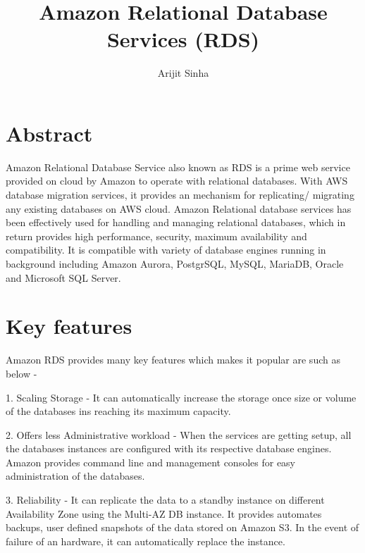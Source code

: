 
\title{Amazon Relational Database Services (RDS)}


\author{Arijit Sinha}


\renewcommand{\shortauthors}{A.Sinha}


\maketitle

\section{Abstract}

Amazon Relational Database Service also known as RDS is a prime web service 
provided on cloud by Amazon to operate with relational databases. 
With AWS database migration services, it provides an mechanism for 
replicating/ migrating any existing databases on AWS cloud.
Amazon Relational database services has been effectively used for  handling
and managing relational databases, which in return provides high performance, 
security, maximum availability and compatibility. 
It is compatible with variety of database engines running in background 
including Amazon Aurora, PostgrSQL, MySQL, MariaDB, Oracle and 
Microsoft SQL Server.

\section{Key features}

Amazon RDS provides many key features which makes it popular are such as below - 

1. Scaling Storage - It can automatically increase the storage once size or 
volume of the databases ins reaching its maximum capacity.

2. Offers less Administrative workload - When the services are getting setup, 
all the databases instances are configured with its respective database engines. 
Amazon provides command line and management consoles for easy administration 
of the databases.

3. Reliability - It can replicate the data to a standby instance on different 
Availability Zone using the Multi-AZ DB instance. It provides  automates 
backups, user defined snapshots of the data stored on Amazon S3. In the event 
of failure of an hardware, it can automatically replace the instance.

